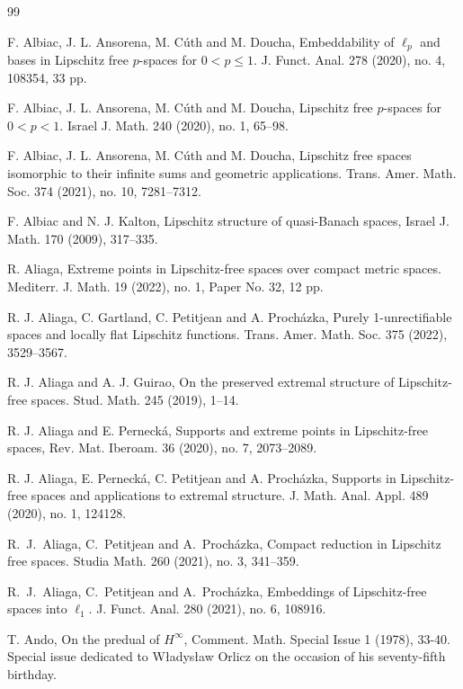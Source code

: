 \documentclass[12pt,leqno]{amsart}
\numberwithin{equation}{section} %
\theoremstyle{definition}
\numberwithin{equation}{section}
\begin{document}
\begin{thebibliography}{99}

F. Albiac, J. L. Ansorena, M. C\'uth and M. Doucha, Embeddability of $\ell_p$ and bases in Lipschitz free $p$-spaces for $0<p\leq 1$. J. Funct. Anal. 278 (2020), no. 4, 108354, 33 pp.

F. Albiac, J. L. Ansorena, M. C\'uth and M. Doucha, Lipschitz free $p$-spaces for $0<p<1$. Israel J. Math. 240 (2020), no. 1, 65--98. 

F. Albiac, J. L. Ansorena, M. C\'uth and M. Doucha, Lipschitz free spaces isomorphic to their infinite sums and geometric applications. Trans. Amer. Math. Soc. 374 (2021), no. 10, 7281--7312. 

F. Albiac and N. J. Kalton, Lipschitz structure of quasi-Banach spaces, Israel J. Math. 170 (2009), 317--335.

R. Aliaga, Extreme points in Lipschitz-free spaces over compact metric spaces. Mediterr. J. Math. 19 (2022), no. 1, Paper No. 32, 12 pp. 

R. J. Aliaga, C. Gartland, C. Petitjean and A. Proch\'azka, Purely 1-unrectifiable spaces and locally flat Lipschitz functions. Trans. Amer. Math. Soc. 375 (2022), 3529--3567.

R. J. Aliaga and A. J. Guirao, On the preserved extremal structure of Lipschitz-free spaces. Stud. Math. 245 (2019), 1--14.

R. J. Aliaga and E. Perneck\'a, Supports and extreme points in Lipschitz-free spaces, Rev. Mat. Iberoam. 36 (2020), no. 7, 2073--2089.

R. J. Aliaga, E. Perneck\'a, C. Petitjean and A. Proch\'azka, Supports in Lipschitz-free spaces and applications to extremal structure. J. Math. Anal. Appl. 489 (2020), no. 1, 124128.

R.~J.~Aliaga, C.~Petitjean and A.~Proch\'azka, Compact reduction in Lipschitz free spaces. Studia Math. 260 (2021), no. 3, 341--359.


R.~J.~Aliaga, C.~Petitjean and A.~Proch\'azka, Embeddings of Lipschitz-free spaces into $\ell_1$. J. Funct. Anal. 280 (2021), no. 6, 108916.

T. Ando, On the predual of $H^\infty$, Comment. Math. Special Issue 1 (1978), 33-40. Special
issue dedicated to W\l{}adys\l{}aw Orlicz on the occasion of his seventy-fifth birthday.


\end{thebibliography}
\end{document}
